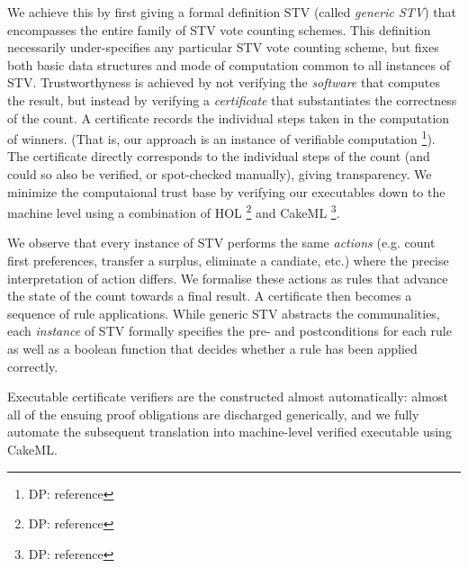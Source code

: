 \documentclass[10pt,conference]{IEEEtran}
\begin{document}

We achieve this by first giving a formal definition STV (called
\emph{generic STV}) 
that 
encompasses the entire family of STV vote counting
schemes. This definition necessarily under-specifies any particular
STV vote counting scheme, but fixes both basic data structures and
mode of computation common to all instances of STV. Trustworthyness is achieved by
not verifying the \emph{software} that computes the result, but
instead by verifying a \emph{certificate} that substantiates the
correctness of the count. A certificate records the individual
steps taken in the computation of winners. (That is, our approach is
an instance of verifiable computation \footnote{DP: reference}). The
certificate directly corresponds to the individual steps of the
count (and could so also be verified, or spot-checked manually),
giving transparency. We minimize the computaional trust base by
verifying our executables down to the machine level using a
combination of HOL \footnote{DP: reference} and CakeML \footnote{DP:
reference}. 

We observe that every instance of STV performs the same \emph{actions}
(e.g. count first preferences, transfer a surplus, eliminate a
candiate, etc.) where the precise interpretation of action differs.
We formalise these actions as rules that advance the state of the
count towards a final result. A certificate then becomes a
sequence of rule applications. While generic STV abstracts the
communalities, each \emph{instance} of STV formally specifies the
pre- and postconditions for each rule as well as a boolean function
that decides whether a rule has been applied correctly. 

Executable certificate verifiers are the constructed almost
automatically: 
almost all of the ensuing proof obligations are discharged
generically, and we fully 
automate the subsequent translation into machine-level verified executable using CakeML.
\end{document}
